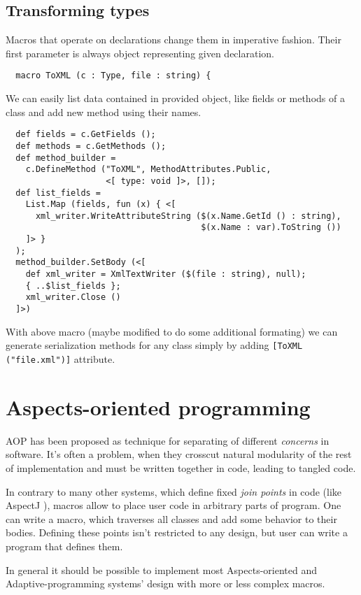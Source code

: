 \documentclass{llncs}
\begin{document}
\subsection{Transforming types}
Macros that operate on declarations change them in imperative fashion.
Their first parameter is always object representing given declaration. 

\begin{verbatim}
  macro ToXML (c : Type, file : string) { 
\end{verbatim}

We can easily list data contained in provided object, like fields or methods 
of a class and add new method using their names.

\begin{verbatim}
  def fields = c.GetFields ();
  def methods = c.GetMethods ();
  def method_builder = 
    c.DefineMethod ("ToXML", MethodAttributes.Public, 
                    <[ type: void ]>, []);
  def list_fields = 
    List.Map (fields, fun (x) { <[ 
      xml_writer.WriteAttributeString ($(x.Name.GetId () : string), 
                                       $(x.Name : var).ToString ()) 
    ]> }
  );
  method_builder.SetBody (<[
    def xml_writer = XmlTextWriter ($(file : string), null);
    { ..$list_fields };
    xml_writer.Close ()
  ]>)
\end{verbatim}

With above macro (maybe modified to do some additional formating) we can
generate serialization methods for any class simply by adding 
\verb,[ToXML ("file.xml")], attribute.

\section{Aspects-oriented programming}
AOP has been proposed as technique for separating of different 
\emph{concerns} in software. It's often a problem, when they crosscut 
natural modularity of the rest of implementation and must be written 
together in code, leading to tangled code. 

In contrary to many other systems, which define fixed \emph{join points}
in code (like AspectJ \cite{AspectJ}), macros allow to place user code in 
arbitrary parts of program. One can write a macro, which traverses all classes
and add some behavior to their bodies. Defining these points isn't
restricted to any design, but user can write a program that defines them.

In general it should be possible to implement most Aspects-oriented
and Adaptive-programming systems' design with more or less complex 
macros.
\end{document}
